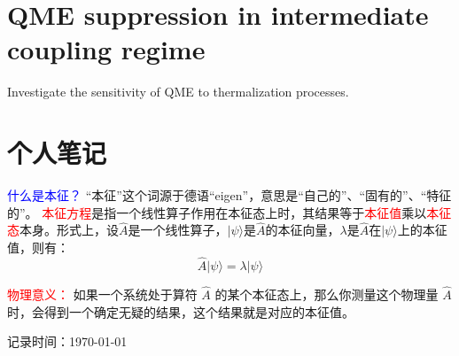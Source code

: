 \documentclass[11pt,a4paper]{article}
\begin{document}
\section{QME suppression in intermediate coupling regime}
Investigate the sensitivity of QME to thermalization processes.






\section{个人笔记 }
\textcolor{blue}{什么是本征？}
“本征”这个词源于德语“eigen”，意思是“自己的”、“固有的”、“特征的”。
\textcolor{red}{本征方程}是指一个线性算子作用在本征态上时，其结果等于\textcolor{red}{本征值}乘以\textcolor{red}{本征态}本身。形式上，设$\hat{A}$是一个线性算子，$| \psi \rangle$是$\hat{A}$的本征向量，$\lambda$是$\hat{A}$在$| \psi \rangle$上的本征值，则有：
\begin{equation}
\hat{A} | \psi \rangle = \lambda | \psi \rangle
\end{equation}

\textcolor{red}{物理意义：}
如果一个系统处于算符 $\hat{A}$ 的某个本征态上，那么你测量这个物理量 $\hat{A}$ 时，会得到一个确定无疑的结果，这个结果就是对应的本征值。

\vfill
{\small 记录时间：\today\ \currenttime}
\end{document}
